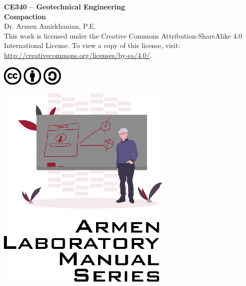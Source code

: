 \documentclass[12pt]{article}
\newcommand{\CourseNum}{CE340}
\newcommand{\CourseName}{Geotechnical Engineering}
\newcommand{\LabTitle}{Compaction}
\begin{document}
\begin{titlepage}
\begin{flushright}
\LARGE{\textbf{\CourseNum{} -- \CourseName}}\\
\vfill
\Huge{\textbf{\LabTitle}}\\
    \vfill
    \large Dr. Armen Amirkhanian, P.E.\\
\vfill
\normalsize This work is licensed under the Creative Commons Attribution-ShareAlike 4.0 International License. To view a copy of this license, visit:
\href{http://creativecommons.org/licenses/by-sa/4.0/}{http://creativecommons.org/licenses/by-sa/4.0/}.

\includegraphics[width=0.07\textwidth]{cc.eps}
\includegraphics[width=0.07\textwidth]{by.eps}
\includegraphics[width=0.07\textwidth]{sa.eps}
\vfill

\includegraphics[width=0.3\linewidth]{Logo.eps}\\ 
 
  
\end{flushright}
\end{titlepage}
\end{document}
